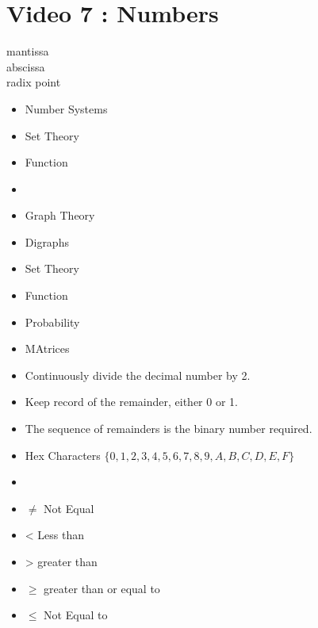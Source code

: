 \documentclass[]{report}
\begin{document}
\section{Video 7 : Numbers}


\begin{description}
\item[mantissa]
\item[abscissa]
\item[radix point]
\end{description}

\begin{itemize}
\item Number Systems
\item Set Theory
\item Function
\item 
\item Graph Theory
\end{itemize}



\begin{itemize}
\item Digraphs
\item Set Theory
\item Function
\item Probability
\item MAtrices
\end{itemize}



\begin{itemize}
\item Continuously divide the decimal number by 2.
\item Keep record of the remainder, either 0 or 1.
\item The sequence of remainders is the binary number required.
\end{itemize}


\begin{itemize}
\item Hex Characters $\{0,1,2,3,4,5,6,7,8,9,A,B,C,D,E,F\}$
\item 
\end{itemize}


\begin{itemize}
\item $\neq$ Not Equal
\item < Less than
\item > greater than
\item $\geq$ greater than or equal to
\item $\leq$ Not Equal to
\end{itemize}
\end{document}
